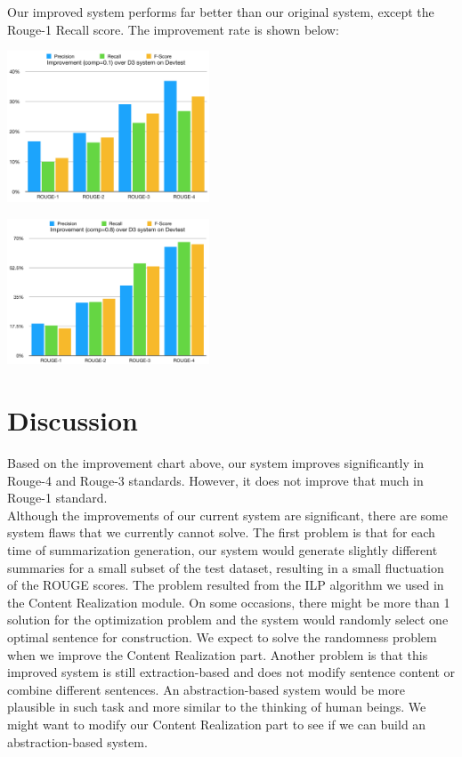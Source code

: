 \documentclass[11pt]{article}
\begin{document}
\indent
Our improved system performs far better than our original system, except the Rouge-1 Recall score. The improvement rate is shown below:
\begin{center}
\includegraphics[width=0.45\textwidth]{perc_d4.png}
\end{center}
\begin{center}
\includegraphics[width=0.45\textwidth]{perc_d4_2.png}
\end{center}
\section{Discussion}
Based on the improvement chart above, our system improves significantly in Rouge-4 and Rouge-3 standards. However, it does not improve that much in Rouge-1 standard. \\
\indent
Although the improvements of our current system are significant, there are some system flaws that we currently cannot solve. The first problem is that for each time of summarization generation, our system would generate slightly different summaries for a small subset of the test dataset, resulting in a small fluctuation of the ROUGE scores. The problem resulted from the ILP algorithm we used in the Content Realization module. On some occasions, there might be more than 1 solution for the optimization problem and the system would randomly select one optimal sentence for construction. We expect to solve the randomness problem when we improve the Content Realization part.
\indent
Another problem is that this improved system is still extraction-based and does not modify sentence content or combine different sentences. An abstraction-based system would be more plausible in such task and more similar to the thinking of human beings. We might want to modify our Content Realization part to see if we can build an abstraction-based system.
\end{document}
